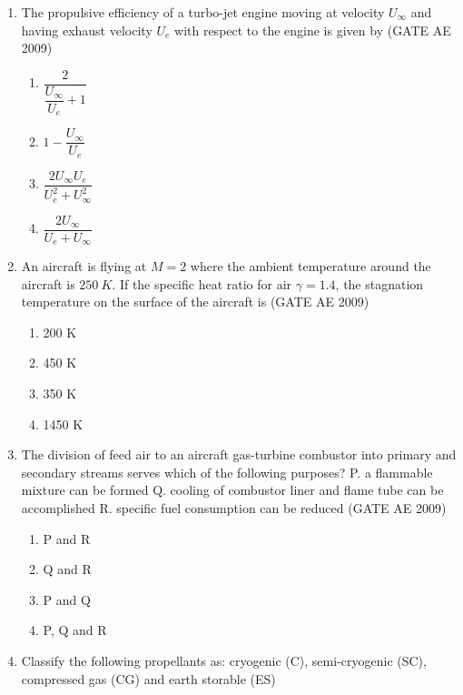 \documentclass[journal,12pt,onecolumn]{IEEEtran}
\theoremstyle{remark}
\begin{document}
\begin{flushleft}
\begin{enumerate}
\item 
The propulsive efficiency of a turbo-jet engine moving at velocity \(U_\infty\) and having exhaust velocity \(U_e\) with respect to the engine is given by
\hfill(GATE AE 2009)
\begin{multicols}{2}
\begin{enumerate}
\item \(\dfrac{2}{\dfrac{U_\infty}{U_e} + 1}\)
\item \(1 - \dfrac{U_\infty}{U_e}\)
\item \(\dfrac{2U_\infty U_e}{U_e^2 + U_\infty^2}\)
\item \(\dfrac{2U_\infty}{U_e + U_\infty}\)
\end{enumerate}
\end{multicols}

\item 
An aircraft is flying at \(M = 2\) where the ambient temperature around the aircraft is \(250~K\). If the specific heat ratio for air \(\gamma = 1.4\), the stagnation temperature on the surface of the aircraft is
\hfill(GATE AE 2009)
\begin{multicols}{2}
\begin{enumerate}
\item 200 K
\item 450 K
\item 350 K
\item 1450 K
\end{enumerate}
\end{multicols}

\item 
The division of feed air to an aircraft gas-turbine combustor into primary and secondary streams serves which of the following purposes?  
P. a flammable mixture can be formed  
Q. cooling of combustor liner and flame tube can be accomplished  
R. specific fuel consumption can be reduced
\hfill(GATE AE 2009)
\begin{multicols}{2}
\begin{enumerate}
\item P and R
\item Q and R
\item P and Q
\item P, Q and R
\end{enumerate}
\end{multicols}

\item 
Classify the following propellants as: cryogenic (C), semi-cryogenic (SC), compressed gas (CG) and earth storable (ES)


\end{enumerate}
\end{flushleft}
\end{document}
